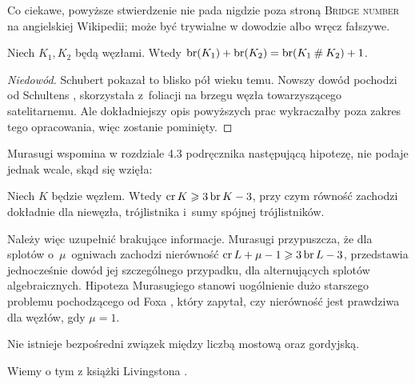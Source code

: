 Co ciekawe, powyższe stwierdzenie nie pada nigdzie poza stroną \textsc{Bridge number} na angielskiej Wikipedii; może być trywialne w dowodzie albo wręcz fałszywe.

\begin{proposition}
\label{prp:bridge_additive}%
    Niech $K_1, K_2$ będą węzłami.
    Wtedy $\operatorname{br} (K_1) + \operatorname{br}(K_2) = \operatorname{br}(K_1 \mathbin{\#} K_2) + 1$.
\end{proposition}

\begin{proof}[Niedowód]
%
%
    Schubert \cite[s. 279]{schubert1954} pokazał to blisko pół wieku temu.
    Nowszy dowód pochodzi od Schultens \cite{schultens2003}, skorzystała z~foliacji na brzegu węzła towarzyszącego satelitarnemu.
    Ale dokładniejszy opis powyższych prac wykraczałby poza zakres tego opracowania, więc zostanie pominięty.
\end{proof}

Murasugi wspomina w rozdziale 4.3 podręcznika \cite{murasugi1996} następującą hipotezę, nie podaje jednak wcale, skąd się wzięła:
%

\begin{conjecture}
%
    Niech $K$ będzie węzłem.
    Wtedy $\operatorname{cr} K \geqslant 3 \operatorname{br} K - 3$, przy czym równość zachodzi dokładnie dla niewęzła, trójlistnika i~sumy spójnej trójlistników.
\end{conjecture}

Należy więc uzupełnić brakujące informacje.
Murasugi \cite{murasugi1988} przypuszcza, że dla splotów o~$\mu$~ogniwach zachodzi nierówność $\operatorname{cr} L + \mu - 1 \geqslant 3 \operatorname{br} L - 3$, przedstawia jednocześnie dowód jej szczególnego przypadku, dla alternujących splotów algebraicznych.
%
Hipoteza Murasugiego stanowi uogólnienie dużo starszego problemu pochodzącego od Foxa \cite{fox1950}, który zapytał, czy nierówność jest prawdziwa dla węzłów, gdy $\mu = 1$.
%

\begin{proposition}
%
\label{no_relation_bridge_unknotting}%
    Nie istnieje bezpośredni związek między liczbą mostową oraz gordyjską.
\end{proposition}

Wiemy o tym z książki Livingstona \cite[s. 146]{livingston1993}.

